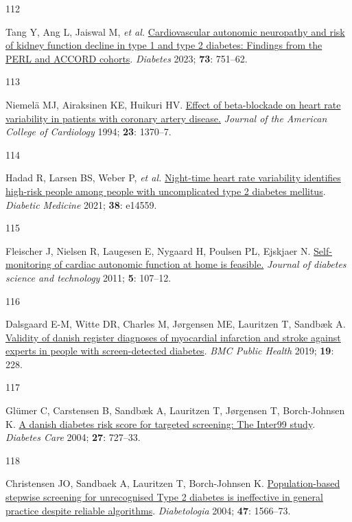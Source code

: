 \documentclass[
  a4paper,
  headsepline=true,
  open=any]{scrbook}
\newlength{\cslhangindent}
\newlength{\csllabelwidth}
\newlength{\cslentryspacingunit} %
\newenvironment{CSLReferences}[2] %
 {%
  \setlength{\parindent}{0pt}
  \ifodd #1
  \let\oldpar\par
  \def\par{\hangindent=\cslhangindent\oldpar}
  \fi
  \setlength{\parskip}{#2\cslentryspacingunit}
 }%
 {}
\newcommand{\CSLLeftMargin}[1]{\parbox[t]{\csllabelwidth}{#1}}
\newcommand{\CSLRightInline}[1]{\parbox[t]{\linewidth - \csllabelwidth}{#1}\break}
\begin{document}
\begin{CSLReferences}{0}{0}
\leavevmode{}%
\CSLLeftMargin{112 }%
\CSLRightInline{Tang Y, Ang L, Jaiswal M, \emph{et al.}
\href{https://doi.org/10.2337/db23-0247}{Cardiovascular autonomic
neuropathy and risk of kidney function decline in type 1 and type 2
diabetes: Findings from the PERL and ACCORD cohorts}. \emph{Diabetes}
2023; \textbf{73}: 751--62.}

\leavevmode{}%
\CSLLeftMargin{113 }%
\CSLRightInline{Niemelä MJ, Airaksinen KE, Huikuri HV.
\href{https://doi.org/10.1016/0735-1097(94)90379-4}{Effect of
beta-blockade on heart rate variability in patients with coronary artery
disease.} \emph{Journal of the American College of Cardiology} 1994;
\textbf{23}: 1370--7.}

\leavevmode{}%
\CSLLeftMargin{114 }%
\CSLRightInline{Hadad R, Larsen BS, Weber P, \emph{et al.}
\href{https://doi.org/10.1111/dme.14559}{Night-time heart rate
variability identifies high-risk people among people with uncomplicated
type 2 diabetes mellitus}. \emph{Diabetic Medicine} 2021; \textbf{38}:
e14559.}

\leavevmode{}%
\CSLLeftMargin{115 }%
\CSLRightInline{Fleischer J, Nielsen R, Laugesen E, Nygaard H, Poulsen
PL, Ejskjaer N.
\href{https://doi.org/10.1177/193229681100500115}{Self-monitoring of
cardiac autonomic function at home is feasible.} \emph{Journal of
diabetes science and technology} 2011; \textbf{5}: 107--12.}

\leavevmode{}%
\CSLLeftMargin{116 }%
\CSLRightInline{Dalsgaard E-M, Witte DR, Charles M, Jørgensen ME,
Lauritzen T, Sandbæk A.
\href{https://doi.org/10.1186/s12889-019-6549-z}{Validity of danish
register diagnoses of myocardial infarction and stroke against experts
in people with screen-detected diabetes}. \emph{BMC Public Health} 2019;
\textbf{19}: 228.}

\leavevmode{}%
\CSLLeftMargin{117 }%
\CSLRightInline{Glümer C, Carstensen B, Sandbæk A, Lauritzen T,
Jørgensen T, Borch-Johnsen K.
\href{https://doi.org/10.2337/diacare.27.3.727}{A danish diabetes risk
score for targeted screening: The Inter99 study}. \emph{Diabetes Care}
2004; \textbf{27}: 727--33.}

\leavevmode{}%
\CSLLeftMargin{118 }%
\CSLRightInline{Christensen JO, Sandbaek A, Lauritzen T, Borch-Johnsen
K. \href{https://doi.org/10.1007/s00125-004-1496-2}{Population-based
stepwise screening for unrecognised Type 2 diabetes is ineffective in
general practice despite reliable algorithms}. \emph{Diabetologia} 2004;
\textbf{47}: 1566--73.}


\end{CSLReferences}
\end{document}
